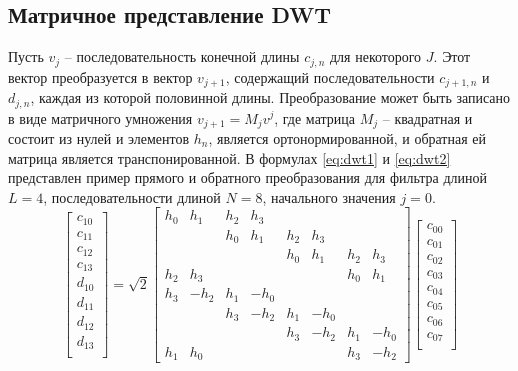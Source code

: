 \subsection{Матричное представление DWT}
Пусть $v_{j}$ – последовательность конечной длины $c_{j,n}$ для некоторого $J$. Этот вектор преобразуется в вектор $v_{j+1}$, содержащий последовательности $c_{j+1,n}$ 
и $d_{j,n}$, каждая из которой половинной длины. Преобразование может быть записано в виде матричного умножения $v_{j+1} = M_{j}v^{j}$, где матрица $M_{j}$ – 
квадратная и состоит из нулей и элементов $h_{n}$, является ортонормированной, и обратная ей матрица является транспонированной.
В формулах \ref{eq:dwt1} и \ref{eq:dwt2} представлен пример прямого и обратного преобразования для фильтра длиной $L=4$, последовательности длиной $N=8$, начального значения $j=0$.
\begin{equation}\label{eq:dwt1}
\begin{bmatrix} 
c_{10} \\ c_{11} \\c_{12} \\c_{13} \\d_{10} \\d_{11} \\d_{12} \\d_{13} \\
\end{bmatrix}
=
\sqrt{2}
\begin{bmatrix} 
h_{0} & h_{1} & h_{2} & h_{3} &       &       &       &       \\ 
      &       & h_{0} & h_{1} & h_{2} & h_{3} &       &       \\ 
      &       &       &       & h_{0} & h_{1} & h_{2} & h_{3} \\
h_{2} & h_{3} &       &       &       &       & h_{0} & h_{1} \\
h_{3} &-h_{2} & h_{1} &-h_{0} &       &       &       &       \\ 
      &       & h_{3} &-h_{2} & h_{1} &-h_{0} &       &       \\ 
      &       &       &       & h_{3} &-h_{2} & h_{1} &-h_{0} \\
h_{1} & h_{0} &       &       &       &       & h_{3} &-h_{2} 
\end{bmatrix}
\begin{bmatrix} 
c_{00} \\ c_{01} \\c_{02} \\c_{03} \\c_{04} \\c_{05} \\c_{06} \\c_{07} \\
\end{bmatrix}
\end{equation}

